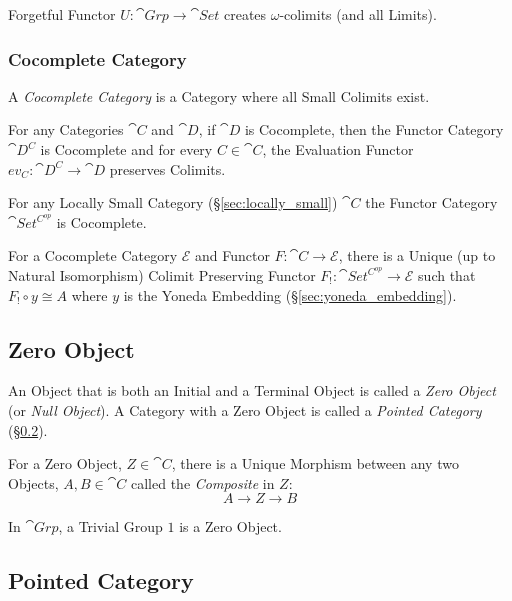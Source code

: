 Forgetful Functor $U : \cat{Grp} \rightarrow \cat{Set}$ creates
$\omega$-colimits (and all Limits). \cite{awodey06}



\subsubsection{Cocomplete Category}\label{sec:cocomplete_category}

A \emph{Cocomplete Category} is a Category where all Small Colimits
exist.

For any Categories $\cat{C}$ and $\cat{D}$, if $\cat{D}$ is
Cocomplete, then the Functor Category $\cat{D^C}$ is Cocomplete and
for every $C \in \cat{C}$, the Evaluation Functor $ev_C :
\cat{D^C} \rightarrow \cat{D}$ preserves Colimits.

For any Locally Small Category (\S\ref{sec:locally_small})
$\cat{C}$ the Functor Category $\cat{Set^{C^{op}}}$ is
Cocomplete.

For a Cocomplete Category $\mathcal{E}$ and Functor $F : \cat{C}
\rightarrow \mathcal{E}$, there is a Unique (up to Natural
Isomorphism) Colimit Preserving Functor $F_! : \cat{Set^{C^{op}}}
\rightarrow \mathcal{E}$ such that $F_! \circ y \cong A$ where $y$ is
the Yoneda Embedding (\S\ref{sec:yoneda_embedding}).\cite{awodey06}



\subsection{Zero Object}\label{sec:zero_object}

An Object that is both an Initial and a Terminal Object is called a
\emph{Zero Object} (or \emph{Null Object}). A Category with a Zero
Object is called a \emph{Pointed Category}
(\S\ref{sec:pointed_category}).

For a Zero Object, $Z \in \cat{C}$, there is a Unique Morphism
between any two Objects, $A, B \in \cat{C}$ called the
\emph{Composite} in $Z$:
\[
  A \rightarrow Z \rightarrow B
\]

In $\cat{Grp}$, a Trivial Group ${1}$ is a Zero Object.



\subsection{Pointed Category}\label{sec:pointed_category}



